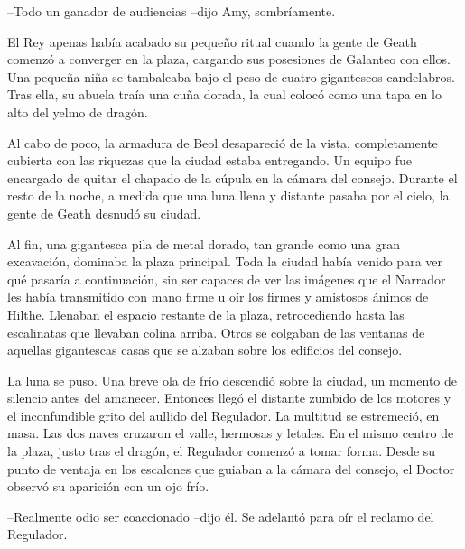 {--Todo un ganador de audiencias --dijo Amy, sombríamente.}

{El Rey apenas había acabado su pequeño ritual cuando la gente de Geath
	comenzó a converger en la plaza, cargando sus posesiones de Galanteo con
	ellos. Una pequeña niña se tambaleaba bajo el peso de cuatro gigantescos
	candelabros. Tras ella, su abuela traía una cuña dorada, la cual colocó
como una tapa en lo alto del yelmo de dragón.}

{Al cabo de poco, la armadura de Beol desapareció de la vista,
	completamente cubierta con las riquezas que la ciudad estaba entregando.
	Un equipo fue encargado de quitar el chapado de la cúpula en la cámara
	del consejo. Durante el resto de la noche, a medida que una luna llena y
distante pasaba por el cielo, la gente de Geath desnudó su ciudad.}

{Al fin, una gigantesca pila de metal dorado, tan grande como una gran
	excavación, dominaba la plaza principal. Toda la ciudad había venido
	para ver qué pasaría a continuación, sin ser capaces de ver las imágenes
	que el Narrador les había transmitido con mano firme u oír los firmes y
	amistosos ánimos de Hilthe. Llenaban el espacio restante de la plaza,
	retrocediendo hasta las escalinatas que llevaban colina arriba. Otros se
	colgaban de las ventanas de aquellas gigantescas casas que se alzaban
sobre los edificios del consejo.}

{La luna se puso. Una breve ola de frío descendió sobre la ciudad, un
	momento de silencio antes del amanecer. Entonces llegó el distante
	zumbido de los motores y el inconfundible grito del aullido del
	Regulador. La multitud se estremeció, en masa. Las dos naves cruzaron el
	valle, hermosas y letales. En el mismo centro de la plaza, justo tras el
	dragón, el Regulador comenzó a tomar forma. Desde su punto de ventaja en
	los escalones que guiaban a la cámara del consejo, el Doctor observó su
aparición con un ojo frío.}

{--Realmente odio ser coaccionado --dijo él. Se adelantó para oír el
reclamo del Regulador.}
